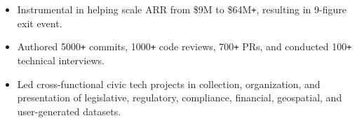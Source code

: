 \documentclass[]{article}
\def\Plus{\texttt{+}}
\begin{document}
\begin{minipage}[t]{0.48\linewidth}
    \begin{itemize}
		\item Instrumental in helping scale ARR from \$9M to \$64M{\Plus}, resulting in 9-figure exit event.
		\item Authored 5000{\Plus} commits, 1000{\Plus} code reviews, 700{\Plus} PRs, and conducted 100{\Plus} technical interviews.
    \end{itemize}

\end{minipage}
\hfill
\begin{minipage}[t]{0.48\linewidth}
    \begin{itemize}
		\item Led cross-functional civic tech projects in collection, organization, and presentation of legislative, regulatory, compliance, financial, geospatial, and user-generated datasets.
    \end{itemize}
\end{minipage}
\end{document}
